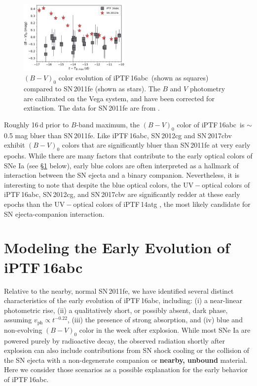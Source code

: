 \documentclass[twocolumn]{aastex61}
\newcommand{\abc}{iPTF\,16abc}
\begin{document}
\begin{figure}[]
  \centering
  \includegraphics[width=0.48\textwidth]{16abc_11fe_colors.pdf}
  \caption{$(B - V)_0$ color evolution of \abc\ (shown as squares) 
    compared to SN\,2011fe (shown as stars). The $B$ and $V$ 
    photometry are calibrated on the Vega system, and have been 
    corrected for extinction. The data for 
    SN\,2011fe are from \citet{2016ApJ...820...67Z}.}
  \label{fig:B-Vcolors}
\end{figure}

Roughly 16\,d prior to $B$-band maximum, the $(B - V)_0$ color of \abc\ is
$\sim$0.5 mag bluer than SN\,2011fe. Like \abc, SN\,2012cg
\citep{2016ApJ...820...92M} and SN\,2017cbv \citep{2017ApJ...845L..11H}
exhibit $(B - V)_0$ colors that are significantly bluer than SN\,2011fe at
very early epochs. While there are many factors that contribute to the early
optical colors of SNe Ia (see \S\ref{sec:lc_energy} below), early blue colors
are often interpreted as a hallmark of interaction between the SN ejecta and a
binary companion. Nevertheless, it is interesting to note that despite the
blue optical colors, the $\mathrm{UV} - \mathrm{optical}$ colors of \abc,
SN\,2012cg, and SN\,2017cbv are significantly redder at these early epochs
than the $\mathrm{UV} - \mathrm{optical}$ colors of iPTF\,14atg
\citep{2015Natur.521..328C}, the most likely candidate for SN ejecta-companion
interaction.

\section{\textbf{Modeling the Early Evolution of \abc}} \label{sec:lc_energy}

Relative to the nearby, normal SN\,2011fe, we have identified several distinct
characteristics of the early evolution of \abc, including: (i) a near-linear
photometric rise, (ii) a qualitatively short, or possibly absent, dark phase,
assuming $v_\mathrm{ph} \propto t^{-0.22}$, (iii) the presence of strong
 absorption, and (iv) blue and non-evolving $(B - V)_0$ color in the
week after explosion. While most SNe Ia are powered purely by radioactive
decay, the observed radiation shortly after explosion can also include
contributions from SN shock cooling or the collision of the SN ejecta with a
non-degenerate companion or \textbf{nearby, unbound} material. Here we
consider those scenarios as a possible explanation for the early behavior of
\abc.
\end{document}
